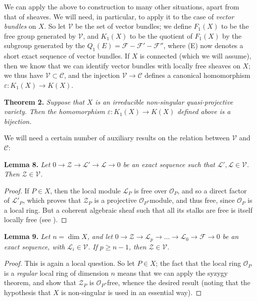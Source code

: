 \documentclass{article}
\newenvironment{itenv}[1]
  {\phantomsection\par\medskip\noindent\textbf{#1.}\itshape}
  {\medskip}
\newcommand{\scr}[1]{{\mathscr{#1}}}
\renewcommand{\cal}[1]{{\mathcal{#1}}}
\renewcommand{\geq}{\geqslant}
\newcommand{\oldpage}[1]{\marginpar{\footnotesize$\Big\vert$ \textit{p.~#1}}}
\begin{document}
We can apply the above to construction to many other situations, apart from that of sheaves.
We will need, in particular, to apply it to the case of \emph{vector bundles} on $X$.
So let $\cal{V}$ be the set of vector bundles;
we define $F_1(X)$ to be the free group generated by $\cal{V}$, and $K_1(X)$ to be the quotient of $F_1(X)$ by the subgroup generated by the $Q_1(E)=\scr{F}-\scr{F}'-\scr{F}''$, where (E) now denotes a short exact sequence of vector bundles.
If $X$ is connected (which we will assume), then we know that we can identify vector bundles with locally free sheaves on $X$;
we thus have $\cal{V}\subset\cal{C}$, and the injection $\cal{V}\to\cal{C}$ defines a canonical homomorphism $\varepsilon\colon K_1(X)\to K(X)$.

\begin{itenv}{Theorem 2}
\label{theorem2}
  Suppose that $X$ is an irreducible non-singular quasi-projective variety.
  Then the homomorphism $\varepsilon\colon K_1(X)\to K(X)$ defined above is a bijection.
\end{itenv}

We will need a certain number of auxiliary results on the relation between $\cal{V}$ and $\cal{C}$:

\begin{itenv}{Lemma 8}
\label{lemma8}
  Let $0\to\scr{Z}\to\scr{L}'\to\scr{L}\to0$ be an exact sequence such that $\scr{L}',\scr{L}\in\cal{V}$.
  Then $\scr{Z}\in\cal{V}$.
\end{itenv}

\begin{proof}
  \oldpage{106}
  If $P\in X$, then the local module $\scr{L}_P$ is free over $\scr{O}_P$, and so a direct factor of $\scr{L}'_P$, which proves that $\scr{Z}_P$ is a projective $\scr{O}_P$-module, and thus free, since $\scr{O}_P$ is a local ring.
  But a coherent algebraic sheaf such that all its stalks are free is itself locally free (see \cite[p.~242, lines~10--11 from the bottom]{12}).
\end{proof}

\begin{itenv}{Lemma 9}
\label{lemma9}
  Let $n=\dim X$, and let $0\to\scr{Z}\to\scr{L}_p\to\ldots\to\scr{L}_0\to\scr{F}\to0$ be an exact sequence, with $\scr{L}_i\in\cal{V}$.
  If $p\geq n-1$, then $\scr{Z}\in\cal{V}$.
\end{itenv}

\begin{proof}
  This is again a local question.
  So let $P\in X$;
  the fact that the local ring $\scr{O}_P$ is a \emph{regular} local ring of dimension $n$ means that we can apply the syzygy theorem, and show that $\scr{Z}_P$ is $\scr{O}_P$-free, whence the desired result (noting that the hypothesis that $X$ is non-singular is used in an essential way).
\end{proof}
\end{document}
